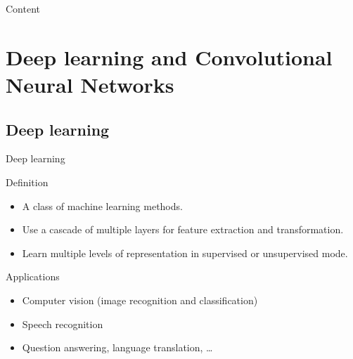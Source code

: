 \documentclass[10pt,svgnames]{beamer}
\begin{document}
\begin{frame}{Content}{}
\tableofcontents
\end{frame}
\section{Deep learning and Convolutional Neural Networks}
\subsection{Deep learning}
\begin{frame}{Deep learning}{}

	\begin{block}{Definition\footnotemark[1]}
		\begin{itemize}
			\item A class of machine learning methods.
			\item Use a cascade of multiple layers for feature extraction and transformation.
			\item Learn multiple levels of representation in supervised or unsupervised mode.
		\end{itemize}
	\end{block}{}
	\pause
	\begin{block}{Applications}
		\begin{itemize}
			\item Computer vision (image recognition and classification)
			\item Speech recognition
			\item Question answering, language translation, \ldots
		\end{itemize}
	\end{block}
	
\end{frame}
\end{document}
